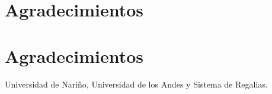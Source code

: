 \documentclass[conference]{IEEEtran}
\begin{document}
\ifCLASSOPTIONcompsoc
  \section*{Agradecimientos}
\else
  \section*{Agradecimientos}
\fi

Universidad de Nariño, Universidad de los Andes y Sistema de Regalias.

\ifCLASSOPTIONcaptionsoff
  \newpage
\fi





\end{document}
